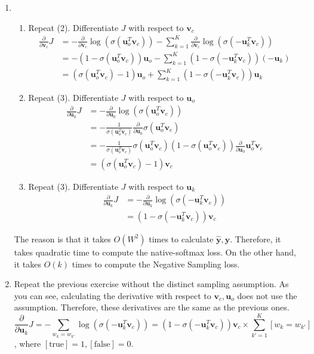 \documentclass{amsart}
\theoremstyle{plain}
\theoremstyle{remark}
\numberwithin{equation}{section}
\begin{document}
\begin{enumerate}
\item \,
\begin{enumerate}
\item Repeat (2). Differentiate $J$ with respect to $\mathbf v_c$ 
\[
\begin{split}
\frac {\partial} {\partial \mathbf v_c} J  & = -\frac {\partial} {\partial \mathbf v_c} \log (\sigma (\mathbf u_o^T \mathbf v_c)) - \sum_{k=1}^K \frac {\partial} {\partial \mathbf v_c} \log (\sigma(-\mathbf u_k^T \mathbf v_c)) \\
& = -(1-\sigma(\mathbf u_o^T \mathbf v_c)) \mathbf u_o - \sum_{k=1}^K (1-\sigma(-\mathbf u_k^T \mathbf v_c)) (-\mathbf u_k) \\
& = (\sigma(\mathbf u_o^T \mathbf v_c) -1)\mathbf u_o + \sum_{k=1}^K (1-\sigma(-\mathbf u_k^T \mathbf v_c)) \mathbf u_k
\end{split}
\]

\item Repeat (3). Differentiate $J$ with respect to $\mathbf u_o$ 
\[
\begin{split}
\frac \partial {\partial \mathbf u_0} J & = - \frac \partial {\partial \mathbf u_0} \log (\sigma (\mathbf u_o^T \mathbf v_c)) \\
&= - \frac 1 {\sigma(\mathbf u_o^T \mathbf v_c)} \frac \partial {\partial \mathbf u_0} \sigma (\mathbf u_o^T \mathbf v_c) \\
& = - \frac 1 {\sigma(\mathbf u_o^T \mathbf v_c)} \sigma(\mathbf u_o^T \mathbf v_c)(1- \sigma(\mathbf u_o^T \mathbf v_c)) \frac \partial {\partial \mathbf u_0} \mathbf u_o^T \mathbf v_c \\
& = (\sigma(\mathbf u_o^T \mathbf v_c)-1) \mathbf v_c
\end{split}
\]
\item Repeat (3). Differentiate $J$ with respect to $\mathbf u_k$ 
\[
\begin{split} 
\frac \partial {\partial \mathbf u_k} J &= -\frac \partial {\partial \mathbf u_k} \log(\sigma (-\mathbf u_k^T \mathbf v_c)) \\
& = (1-\sigma(-\mathbf u_k^T \mathbf v_c)) \mathbf v_c
\end{split}
\]
\end{enumerate}

The reason is that it takes $O(W^2)$ times to calculate $\mathbf {\hat y}, \mathbf y$. Therefore, it takes quadratic time to compute the native-softmax loss. On the other hand, it takes $O(k)$ times to compute the Negative Sampling loss. 

\item Repeat the previous exercise without the distinct sampling assumption. As you can see, calculating the derivative with respect to $\mathbf v_c, \mathbf u_o$ does not use the assumption. Therefore, these derivatives are the same as the previous ones. 
\[ 
\frac \partial {\partial \mathbf u_k} J = -\sum_{w_k = w_{k'}} \log(\sigma(-\mathbf u_k^T \mathbf v_c)) = (1-\sigma(-\mathbf u_k^T \mathbf v_c)) \mathbf v_c \times\sum_{k'=1}^K [w_k = w_{k'} ]
\]
, where $[ \text{true} ] = 1, [ \text{false} ] = 0$.



\end{enumerate}
\end{document}
